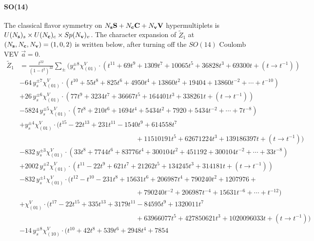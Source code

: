 \documentclass[letterpaper, 11pt]{article}
\newcommand{\nn}{\nonumber}
\begin{document}
{  \paragraph{SO(14)} The classical flavor symmetry  on $N_{\bf s} \mathbf{S}+N_{\bf c} \mathbf{C}+ N_{\bf v} \mathbf{V}$ hypermultiplets is $U(N_{\bf s})_s \times U(N_{\bf c})_c  \times Sp(N_{\bf v})_v$. The character expansion of  $\tilde{Z}_1$ at $(N_{\bf s},N_{\bf c}, N_{\bf v}) = (1,0,2)$ is written below, after turning off the $SO(14)$ Coulomb VEV $\vec{a} = 0$. 
  \begin{align}
  \label{eq:so14-s1v2}
  \tilde{Z}_1&=\frac{t^{22}}{(1-t^2)^{22}}\sum_{\pm}\Big(y_s^{\pm8}\chi^V_{(01)}\cdot (t^{11}+69 t^9+1309 t^7+10065 t^5+36828 t^3+69300
  t+  (t\rightarrow t^{-1}) )\nn\\
  &-64\,y_s^{\pm7}\chi^V_{(01)}\cdot (t^{10}+55 t^8+825 t^6+4950 t^4+13860
  t^2+19404+13860t^{-2} + \cdots + t^{-10})\nn\\
  &+26\,y_s^{\pm6}\chi^V_{(01)}\cdot (77 t^9+3234 t^7+36667 t^5+164401 t^3+338261
  t+  (t\rightarrow t^{-1}))\nn\\
  &-5824\,y_s^{\pm5}\chi^V_{(01)}\cdot (7 t^8+210 t^6+1694 t^4+5434
  t^2+7920+ 5434t^{-2} + \cdots + 7t^{-8}) \nn\\
  &+y_s^{\pm4}\chi^V_{(01)}\cdot (t^{15}-22 t^{13}+231 t^{11}-1540 t^9+614558 t^7\nn\\
  &\qquad\qquad\qquad\qquad\qquad\qquad\qquad\qquad\quad +11510191 t^5+62671224 t^3+139186397t+  (t\rightarrow t^{-1}))\nn\\
  &-832\,y_s^{\pm3}\chi^V_{(01)}\cdot (33 t^8+7744 t^6+83776 t^4+300104
  t^2+451192+300104t^{-2} + \cdots + 33t^{-8})\nn\\
  &+2002\,y_s^{\pm2}\chi^V_{(01)}\cdot (t^{11}-22 t^9+621 t^7+21262 t^5+134245 t^3+314181t+  (t\rightarrow t^{-1}) )\nn\\
  &-832\,y_s^{\pm1}\chi^V_{(01)}\cdot (t^{12}-t^{10}-231 t^8+15631 t^6+206987 t^4+790240t^2+1207976+ \nn\\
  &\qquad\qquad\qquad\qquad\qquad\qquad\qquad\qquad\quad +790240t^{-2} +206987 t^{-4} +  15631 t^{-6} + \cdots + t^{-12}) \nn\\
  &+\chi^V_{(01)}\cdot (t^{17}-22 t^{15}+335 t^{13}+3179 t^{11}-84595 t^9+1320011 t^7\nn\\
  &\qquad\qquad\qquad\qquad\qquad\qquad\qquad\qquad\quad +63966077 t^5+427850621 t^3+1020096033t+  (t\rightarrow t^{-1}) ) \nn\\
  &-14\,y_s^{\pm8}\chi^V_{(10)}\cdot  (t^{10}+42 t^8+539 t^6+2948 t^4+7854

\end{align}}
\end{document}
